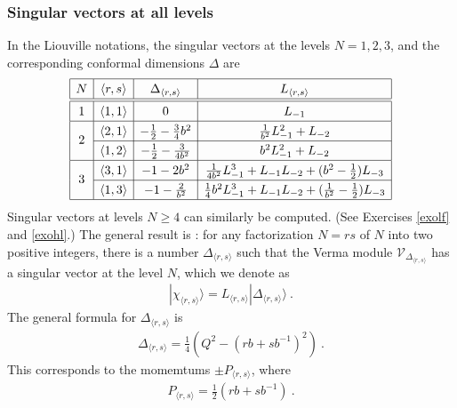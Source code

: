 \documentclass[12pt, a4paper, notitlepage, twoside]{report}
\numberwithin{equation}{section}
\theoremstyle{break}
\begin{document}
\subsubsection{Singular vectors at all levels}

In the Liouville notations, the singular vectors at the levels $N=1,2,3$, and the corresponding conformal dimensions $\Delta$ are 
\begin{align}
\renewcommand{\arraystretch}{1.3}
\begin{array}{|c|c|c|c|}
\hline 
N & \langle r,s\rangle & \Delta_{\langle r,s\rangle} & L_{\langle r,s\rangle} 
\\
\hline\hline
1 & \langle 1,1\rangle & 0  & L_{-1}
\\
\hline
\multirow{2}{*}{2} & 
\langle 2,1\rangle & -\frac12 -\frac{3}{4} b^2  & \frac{1}{b^2}L_{-1}^2 + L_{-2}
\\
\cline{2-4}
& \langle 1,2\rangle & -\frac12 - \frac{3}{4b^2}  & b^2L_{-1}^2 + L_{-2} 
\\
\hline
\multirow{2}{*}{3} &
\langle 3,1 \rangle &  -1 -2 b^2  & \frac{1}{4b^2}L_{-1}^3 + L_{-1}L_{-2}+(b^2-\frac12)L_{-3}
\\
\cline{2-4}
& \langle 1,3 \rangle &  -1 - \frac{2}{b^2}  & \frac14 b^2L_{-1}^3 + L_{-1}L_{-2} + (\frac{1}{b^2}-\frac12)L_{-3}
\\
\hline
\end{array}
\label{lot}
\end{align}
Singular vectors at levels $N\geq 4$ can similarly be computed. (See Exercises \ref{exolf} and \ref{exohl}.) The general result is \cite{fms97}: for any factorization $N=rs$ of $N$ into two positive integers, there is a number $\Delta_{\langle r,s \rangle}$ such that the Verma module $\mathcal{V}_{\Delta_{\langle r,s \rangle}}$ has a singular vector at the level $N$, which we denote as
\begin{align}
 |\chi_{\langle r,s \rangle}\rangle = L_{\langle r,s \rangle} |\Delta_{\langle r,s \rangle}\rangle\ .
\label{lrs}
\end{align}
The general formula for $\Delta_{\langle r,s \rangle}$ is
\begin{align}
 \Delta_{\langle r,s \rangle} = \frac14\left(Q^2-(rb+sb^{-1})^2\right)\ .
\label{drs}
\end{align}
This corresponds to the momemtums $\pm P_{\langle r,s \rangle}$, where
\begin{align}
 \boxed{P_{\langle r,s \rangle} = \frac12\left(rb + sb^{-1}\right) }\ . 
\label{ars}
\end{align}
\end{document}
